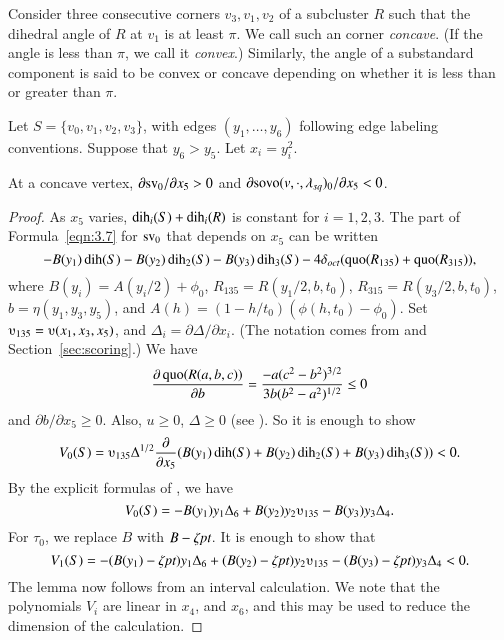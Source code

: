 \begin{definition} %
Consider three consecutive corners $v_3,v_1,v_2$ of a subcluster
$R$ such that the dihedral angle of $R$ at $v_1$ is at least
$\pi$.  We call such an corner {\it concave}.  (If the angle is
less than $\pi$, we call it {\it convex}.)  Similarly, the angle
of a substandard component is said to be convex or concave depending on
whether it is less than or greater than $\pi$.
\end{definition}

Let
    $S=\{v_0,v_1,v_2,v_3\}$, with edges $(y_1,\ldots,y_6)$ 
following edge labeling conventions.
Suppose that $y_6>y_5$.  Let $x_i=y_i^2$.

\begin{lemma}
At a concave vertex, $\partial {\operatorname{sv}}_0/\partial x_5 >0$ and
    $\partial {\operatorname{sovo}}(v,\cdot,\lambda_{sq})_0/\partial x_5<0$.
\end{lemma}

\begin{proof}
As $x_5$ varies, $\operatorname{dih}_i(S)+\operatorname{dih}_i(R)$ is constant for $i=1,2,3$. The
part of Formula~\ref{eqn:3.7} for ${\operatorname{sv}}_0$ that depends on $x_5$ can be
written
    $$-B(y_1)\operatorname{dih}(S)-B(y_2)\operatorname{dih}_2(S)-B(y_3)\operatorname{dih}_3(S)-4\delta_{oct}
        (\operatorname{quo}(R_{135})+\operatorname{quo}(R_{315})),
    $$
where $B(y_i)=A(y_i/2)+\phi_0$, $R_{135}=R(y_1/2,b,t_0)$,
$R_{315}=R(y_3/2,b,t_0)$, $b=\eta(y_1,y_3,y_5)$, and $A(h) =
(1-h/t_0)(\phi(h,t_0)-\phi_0)$. Set $\ups_{135}=\ups(x_1,x_3,x_5)$, and
$\Delta_i = \partial \Delta/\partial x_i$. (The notation comes from
\cite[Sec.~8]{part1} and Section~\ref{sec:scoring}.) We have
    $$\frac{\partial \operatorname{quo}(R(a,b,c))}{\partial b} =
        \frac{-a (c^2-b^2)^{3/2}}{3 b (b^2-a^2)^{1/2}}\le 0
    $$
and $\partial b/\partial x_5\ge0$.  Also, $u\ge0$, $\Delta\ge0$ (see
\cite[Sec.~8]{part1}).  So it is enough to show
    $$V_0(S) = \ups_{135}\Delta^{1/2}
        \frac{\partial}{\partial x_5} (B(y_1)\dih(S)+B(y_2)\dih_2(S)
        + B(y_3)\dih_3(S))< 0.
    $$
By the explicit formulas of \cite[Sec.~8]{part1}, we have
    $$
    V_0(S) = -B(y_1)y_1\Delta_6 + B(y_2)y_2 \ups_{135} - B(y_3)y_3 \Delta_4.
    $$
For $\tau_0$, we replace $B$ with $B-\zeta\hbox{\it pt}$. It is enough to
show that
    $$
    V_1(S) = -(B(y_1)-\zeta\pt)y_1\Delta_6 + (B(y_2)-\zeta\pt)y_2 \ups_{135} -
        (B(y_3)-\zeta\pt)y_3 \Delta_4<0.
    $$
The lemma now follows from an interval calculation.
We note that the polynomials $V_i$
are linear in $x_4$, and $x_6$, and this may be used to reduce the
dimension of the calculation.
\end{proof}

